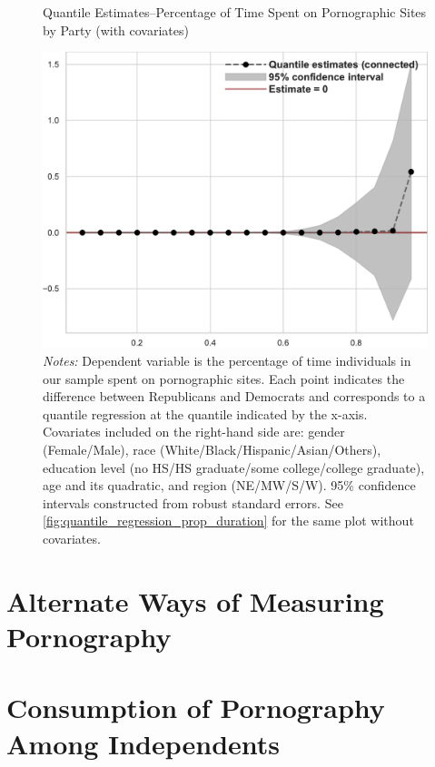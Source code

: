 \documentclass[12pt, letterpaper]{article}
\begin{document}
\begin{figure}[ht]
	\centering
	\caption{Quantile Estimates--Percentage of Time Spent on Pornographic Sites by Party (with covariates)}
	\includegraphics[width=.55\linewidth]{../figs/quantile_reg_covariates_proportion_duration_adult.pdf}
	\caption*{\footnotesize \emph{Notes:} 
		Dependent variable is the percentage of time individuals in our sample spent on pornographic sites.
		Each point indicates the difference between Republicans and Democrats and corresponds to a quantile regression at the quantile indicated by the x-axis.
		Covariates included on the right-hand side are: gender (Female/Male), race (White/Black/Hispanic/Asian/Others), education level (no HS/HS graduate/some college/college graduate), age and its quadratic, and region (NE/MW/S/W).
		95\% confidence intervals constructed from robust standard errors.
		See \cref{fig:quantile_regression_prop_duration} for the same plot without covariates.
	}
	\label{fig:quantile_regression_prop_duration_covariates}
\end{figure}
\clearpage
\section{Alternate Ways of Measuring Pornography}
\label{si:alternate_ways}
\clearpage

\section{Consumption of Pornography Among Independents}
\end{document}
